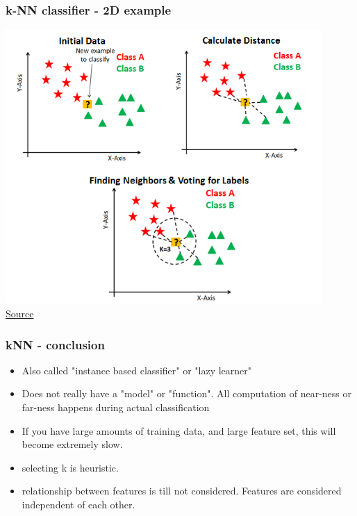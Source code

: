 \documentclass{beamer}
\begin{document}
\begin{frame}
\frametitle{k-NN classifier - 2D example}
\includegraphics[width=0.9\textwidth]{figures/knnexample.png}
\\ \href{https://www.datacamp.com/community/tutorials/k-nearest-neighbor-classification-scikit-learn}{Source}
\end{frame}

\begin{frame}
\frametitle{kNN - conclusion}
\begin{itemize}
\item Also called "instance based classifier" or "lazy learner"
\item Does not really have a "model" or "function". All computation of near-ness or far-ness happens during actual classification
\item If you have large amounts of training data, and large feature set, this will become extremely slow. 
\item selecting k is heuristic.
\item relationship between features is till not considered. Features are considered independent of each other.
\end{itemize}
\end{frame}
\end{document}
